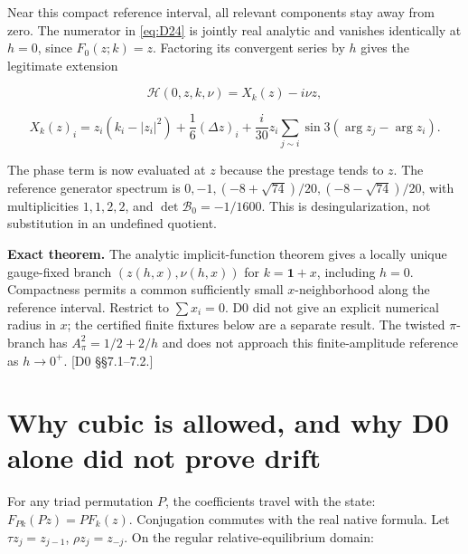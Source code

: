 \documentclass[11pt,a4paper]{article}
\begin{document}
Near this compact reference interval, all relevant components stay away from zero. The numerator in \eqref{eq:D24} is jointly real analytic and vanishes identically at \(h=0\), since \(F_0(z;k)=z\). Factoring its convergent series by \(h\) gives the legitimate extension

\[
\mathcal H(0,z,k,\nu)=X_k(z)-i\nu z,
\tag{D26}\label{eq:D26}
\]

\[
X_k(z)_i=z_i(k_i-|z_i|^2)+\frac16(\Delta z)_i
+\frac i{30}z_i\sum_{j\sim i}\sin3(\arg z_j-\arg z_i).
\tag{D27}\label{eq:D27}
\]

The phase term is now evaluated at \(z\) because the prestage tends to \(z\). The reference generator spectrum is
\(0,-1,(-8+\sqrt{74})/20,(-8-\sqrt{74})/20\),
with multiplicities \(1,1,2,2\), and \(\det\mathcal B_0=-1/1600\).
This is desingularization, not substitution in an undefined quotient.

\textbf{Exact theorem.} The analytic implicit-function theorem gives a locally unique gauge-fixed branch \((z(h,x),\nu(h,x))\) for \(k=\mathbf1+x\), including \(h=0\). Compactness permits a common sufficiently small \(x\)-neighborhood along the reference interval. Restrict to \(\sum x_i=0\). D0 did not give an explicit numerical radius in \(x\); the certified finite fixtures below are a separate result. The twisted \(\pi\)-branch has \(A_\pi^2=1/2+2/h\) and does not approach this finite-amplitude reference as \(h\to0^+\). [D0 \S{}\S{}7.1--7.2.]

\section{Why cubic is allowed, and why D0 alone did not prove drift}

For any triad permutation \(P\), the coefficients travel with the state:
\(F_{Pk}(Pz)=PF_k(z)\). Conjugation commutes with the real native formula. Let \(\tau z_j=z_{j-1}\), \(\rho z_j=z_{-j}\). On the regular relative-equilibrium domain:
\end{document}
